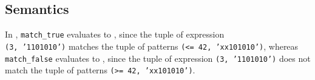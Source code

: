 \FormallyParagraph
\begin{mathpar}
\end{mathpar}

\subsection{Semantics}
In ,
\texttt{match\_true} evaluates to \True, since
the tuple of expression \\
\texttt{(3, '1101010')} matches the tuple of patterns \texttt{(<= 42, 'xx101010')},
whereas \\
\texttt{match\_false} evaluates to \False, since
the tuple of expression \texttt{(3, '1101010')} does not match the tuple of patterns \texttt{(>= 42, 'xx101010')}.

